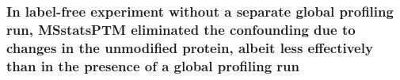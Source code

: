 \documentclass[mcp]{article}
\numberwithin{table}{section}
\def\todo#1{{\color{red}[#1]}}
\begin{document}



\subsubsection*{In label-free experiment without a separate global profiling run, MSstatsPTM eliminated the confounding due to changes in the unmodified protein, albeit less effectively than in the presence of a global profiling run}
\end{document}
